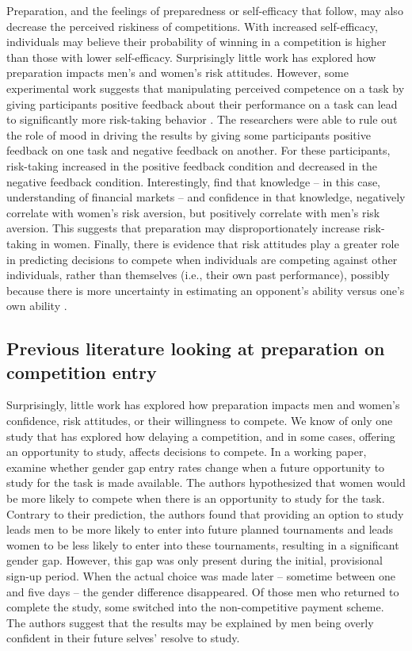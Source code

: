 \documentclass[letterpaper, nobind]{templates/ociamthesis}
\begin{document}
Preparation, and the feelings of preparedness or self-efficacy that follow, may also decrease the perceived riskiness of competitions. With increased self-efficacy, individuals may believe their probability of winning in a competition is higher than those with lower self-efficacy. Surprisingly little work has explored how preparation impacts men's and women's risk attitudes. However, some experimental work suggests that manipulating perceived competence on a task by giving participants positive feedback about their performance on a task can lead to significantly more risk-taking behavior \autocite{Krueger1994}. The researchers were able to rule out the role of mood in driving the results by giving some participants positive feedback on one task and negative feedback on another. For these participants, risk-taking increased in the positive feedback condition and decreased in the negative feedback condition. Interestingly, \textcite{Gysler2002} find that knowledge -- in this case, understanding of financial markets -- and confidence in that knowledge, negatively correlate with women's risk aversion, but positively correlate with men's risk aversion. This suggests that preparation may disproportionately increase risk-taking in women. Finally, there is evidence that risk attitudes play a greater role in predicting decisions to compete when individuals are competing against other individuals, rather than themselves (i.e., their own past performance), possibly because there is more uncertainty in estimating an opponent's ability versus one's own ability \autocite{Apicella2017a}.

\hypertarget{previous-literature-looking-at-preparation-on-competition-entry}{%
\subsection{Previous literature looking at preparation on competition entry}\label{previous-literature-looking-at-preparation-on-competition-entry}}

Surprisingly, little work has explored how preparation impacts men and women's confidence, risk attitudes, or their willingness to compete. We know of only one study that has explored how delaying a competition, and in some cases, offering an opportunity to study, affects decisions to compete. In a working paper, \textcite{Charness2021} examine whether gender gap entry rates change when a future opportunity to study for the task is made available. The authors hypothesized that women would be more likely to compete when there is an opportunity to study for the task. Contrary to their prediction, the authors found that providing an option to study leads men to be more likely to enter into future planned tournaments and leads women to be less likely to enter into these tournaments, resulting in a significant gender gap. However, this gap was only present during the initial, provisional sign-up period. When the actual choice was made later -- sometime between one and five days -- the gender difference disappeared. Of those men who returned to complete the study, some switched into the non-competitive payment scheme. The authors suggest that the results may be explained by men being overly confident in their future selves' resolve to study.
\end{document}
